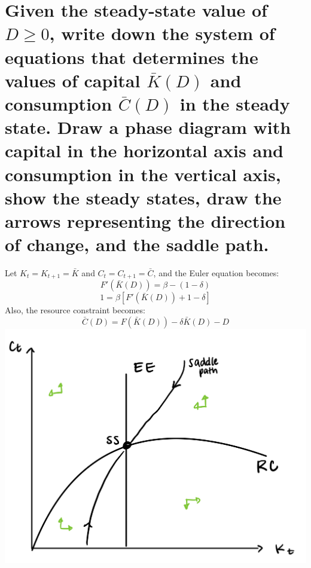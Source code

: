 \documentclass[]{article}
\begin{document}
\section{Given  the  steady-state  value  of $D\ge 0$,  write  down  the  system  of  equations  that determines  the  values  of  capital $\bar{K}(D)$ and  consumption $\bar{C}(D)$  in  the  steady  state. Draw  a  phase  diagram  with  capital  in  the  horizontal  axis  and  consumption  in  the vertical  axis,  show  the  steady  states,  draw  the  arrows  representing the direction of change, and the saddle path.}
Let $K_t = K_{t+1}=\bar{K}$ and $C_t= C_{t+1}=\bar{C}$, and the Euler equation becomes:
\[ F'(\bar{K}(D)) =\beta-(1-\delta) \]
\[1 = \beta [F'(\bar{K}(D))+1-\delta]
\]
Also, the resource constraint becomes:
\[ \bar{C}(D) =F(\bar{K}(D)) -\delta\bar{K}(D) -D \] 
\includegraphics[scale=.3]{q2phase}

\pagebreak
\end{document}
